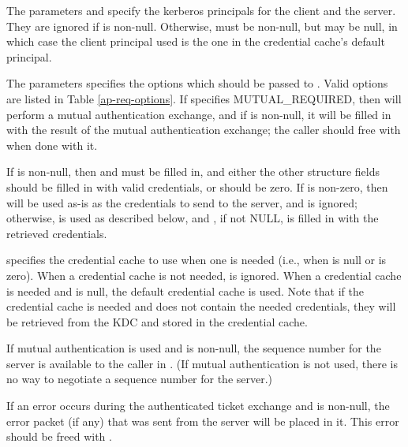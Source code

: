 The parameters  and  specify the
kerberos principals for the client and the server.  They are
ignored if  is non-null.  Otherwise,
 must be non-null, but  may be
null, in which case the client principal used is the one in the
credential cache's default principal.

The  parameters specifies the options which
should be passed to .  Valid options are listed
in Table \ref{ap-req-options}.  If 
specifies MUTUAL_REQUIRED, then  will perform
a mutual authentication exchange, and if  is
non-null, it will be filled in with the result of the mutual
authentication exchange; the caller should free
 with
 when done with it.

If  is non-null, then
 and 
 must be filled in, and either
the other structure fields should be filled in with valid credentials,
or  should be zero.  If
 is non-zero, then
 will be used as-is as the credentials to send to
the server, and  is ignored; otherwise,
 is used as described below, and 
, if not NULL, is filled in with the retrieved credentials.

 specifies the credential cache to use when one is
needed (i.e., when  is null or
 is zero).  When a credential
cache is not needed,  is ignored.  When a credential
cache is needed and  is null, the default credential
cache is used.  Note that if the credential cache is needed and does
not contain the needed credentials, they will be retrieved from the
KDC and stored in the credential cache.

If mutual authentication is used and  is non-null,
the sequence number for the server is available to the caller in
.  (If mutual authentication is not
used, there is no way to negotiate a sequence number for the server.)

If an error occurs during the authenticated ticket exchange and
 is non-null, the error packet (if any) that was sent
from the server will be placed in it.  This error should be freed with
.

